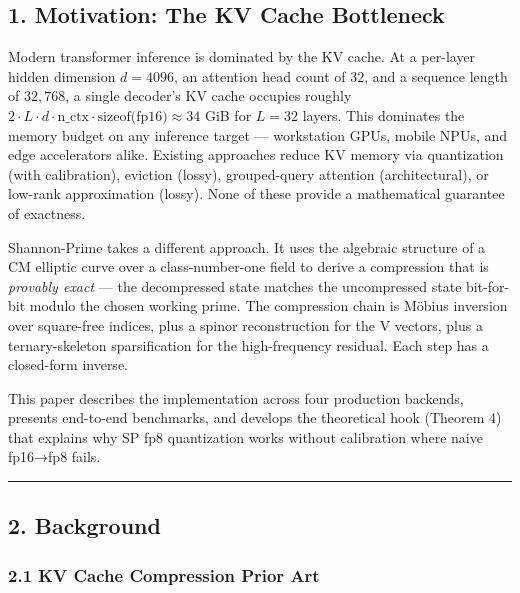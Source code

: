 \documentclass[
  11pt,
]{article}
\begin{document}
\hypertarget{motivation-the-kv-cache-bottleneck}{%
\subsection{1. Motivation: The KV Cache
Bottleneck}\label{motivation-the-kv-cache-bottleneck}}

Modern transformer inference is dominated by the KV cache. At a
per-layer hidden dimension \(d = 4096\), an attention head count of
\(32\), and a sequence length of \(32{,}768\), a single decoder's KV
cache occupies roughly
\(2 \cdot L \cdot d \cdot \text{n\_ctx} \cdot \text{sizeof(fp16)} \approx 34\)
GiB for \(L = 32\) layers. This dominates the memory budget on any
inference target --- workstation GPUs, mobile NPUs, and edge
accelerators alike. Existing approaches reduce KV memory via
quantization (with calibration), eviction (lossy), grouped-query
attention (architectural), or low-rank approximation (lossy). None of
these provide a mathematical guarantee of exactness.

Shannon-Prime takes a different approach. It uses the algebraic
structure of a CM elliptic curve over a class-number-one field to derive
a compression that is \emph{provably exact} --- the decompressed state
matches the uncompressed state bit-for-bit modulo the chosen working
prime. The compression chain is Möbius inversion over square-free
indices, plus a spinor reconstruction for the V vectors, plus a
ternary-skeleton sparsification for the high-frequency residual. Each
step has a closed-form inverse.

This paper describes the implementation across four production backends,
presents end-to-end benchmarks, and develops the theoretical hook
(Theorem 4) that explains why SP fp8 quantization works without
calibration where naive fp16→fp8 fails.

\begin{center}\rule{0.5\linewidth}{0.5pt}\end{center}

\hypertarget{background}{%
\subsection{2. Background}\label{background}}

\hypertarget{kv-cache-compression-prior-art}{%
\subsubsection{2.1 KV Cache Compression Prior
Art}\label{kv-cache-compression-prior-art}}
\end{document}
